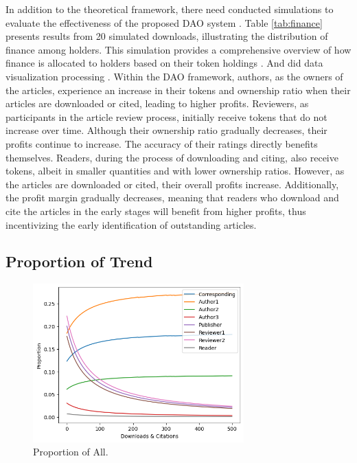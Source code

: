 \documentclass[lettersize,journal]{IEEEtran}
\begin{document}
In addition to the theoretical framework, there need conducted simulations to evaluate the effectiveness of the proposed DAO system \cite{macal2009agent}. Table \ref{tab:finance} presents results from 20 simulated downloads, illustrating the distribution of finance among holders. This simulation provides a comprehensive overview of how finance is allocated to holders based on their token holdings \cite{liu2023incremental}. And did data visualization processing \cite{few2004show}.
Within the DAO framework, authors, as the owners of the articles, experience an increase in their tokens and ownership ratio when their articles are downloaded or cited, leading to higher profits. Reviewers, as participants in the article review process, initially receive tokens that do not increase over time. Although their ownership ratio gradually decreases, their profits continue to increase. The accuracy of their ratings directly benefits themselves. Readers, during the process of downloading and citing, also receive tokens, albeit in smaller quantities and with lower ownership ratios. However, as the articles are downloaded or cited, their overall profits increase. Additionally, the profit margin gradually decreases, meaning that readers who download and cite the articles in the early stages will benefit from higher profits, thus incentivizing the early identification of outstanding articles.


\subsection{Proportion of Trend}


\begin{figure}[h]
  \centering
  \includegraphics[width=3.2in]{assets/proportion-all.png}
  \caption{Proportion of All.}
  \label{fig:proportion-all}
\end{figure}
\end{document}
